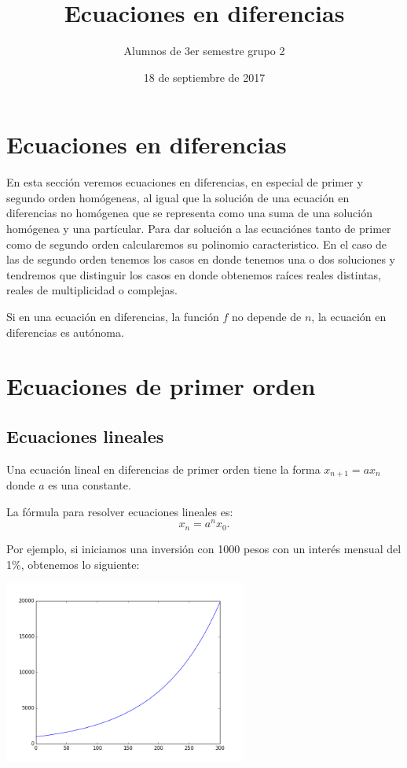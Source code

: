 \documentclass{article}
\title{Ecuaciones en diferencias}
\author{Alumnos de 3er semestre grupo 2}
\date{18 de septiembre de 2017}
\begin{document}
\maketitle
\tableofcontents

\section{Ecuaciones en diferencias}
\label{sec:ecuaciones}

En esta sección veremos ecuaciones en diferencias, en especial de
primer y segundo orden homógeneas, al igual que la solución de una
ecuación en diferencias no homógenea que se representa como una suma
de una solución homógenea y una partícular.  Para dar solución a las
ecuaciónes tanto de primer como de segundo orden calcularemos su
polinomio caracteristico. En el caso de las de segundo orden tenemos
los casos en donde tenemos una o dos soluciones y tendremos que
distinguir los casos en donde obtenemos raíces reales distintas,
reales de multiplicidad o complejas.

Si en una ecuación en diferencias, la función $f$ no depende de $n$,
la ecuación en diferencias es autónoma.

\section{Ecuaciones de primer orden}

\subsection{Ecuaciones lineales}

Una ecuación lineal en diferencias de primer orden tiene la forma
$x_{n+1}=ax_n$ donde $a$ es una constante.

La fórmula para resolver ecuaciones lineales es:
\begin{equation}
  \label{lineal}
  x_n=a^nx_0.
\end{equation}

Por ejemplo, si iniciamos una inversión con 1000 pesos con un interés
mensual del 1\%, obtenemos lo siguiente:

\begin{center}
  \includegraphics[width=8cm]{inversion.png}
\end{center}
\end{document}
